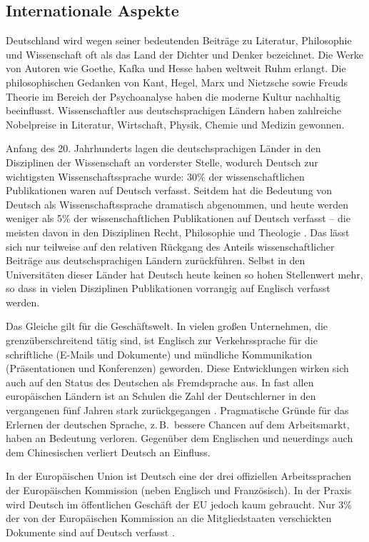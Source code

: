 \begin{multicols}{2}
\subsection{Internationale Aspekte}

Deutschland wird wegen seiner bedeutenden Beiträge zu Literatur, Philosophie und Wissenschaft oft als das Land der Dichter und Denker bezeichnet. 
Die Werke von Autoren wie Goethe, Kafka und Hesse haben weltweit Ruhm erlangt. Die philosophischen Gedanken von Kant, Hegel, Marx und Nietzsche sowie Freuds Theorie im Bereich der Psychoanalyse haben die moderne Kultur nachhaltig beeinflusst. Wissenschaftler aus deutschsprachigen Ländern haben zahlreiche Nobelpreise in Literatur, Wirtschaft, Physik, Chemie und Medizin gewonnen.


Anfang des 20. Jahrhunderts lagen 
die deutschsprachigen Länder in den Disziplinen der Wissenschaft an
vorderster Stelle, wodurch Deutsch zur wichtigsten Wissenschaftssprache wurde: 30\% der wissenschaftlichen Publikationen waren auf Deutsch verfasst. Seitdem hat die Bedeutung von Deutsch als Wissenschaftssprache dramatisch abgenommen, und heute werden weniger als 5\% der wissenschaftlichen Publikationen auf Deutsch verfasst -- die meisten davon in den Disziplinen Recht, Philosophie und Theologie \cite{joy1}. Das lässt sich nur teilweise 
auf den relativen Rückgang des Anteils wissenschaftlicher Beiträge aus deutschsprachigen
Ländern zurückführen. Selbst in den Universitäten dieser Länder hat Deutsch heute keinen so hohen Stellenwert mehr, so dass in vielen Disziplinen Publikationen vorrangig auf Englisch verfasst werden.

Das Gleiche gilt für die Geschäftswelt. In vielen großen Unternehmen, die grenzüberschreitend tätig sind, ist Englisch zur Verkehrssprache für die schriftliche (E-Mails und Dokumente) und mündliche Kommunikation (Präsentationen und Konferenzen) geworden. Diese Entwicklungen wirken sich auch auf den Status des Deutschen als Fremdsprache aus. 
In fast allen europäischen Ländern ist an Schulen die Zahl der Deutschlerner in den vergangenen fünf Jahren stark zurückgegangen \cite{spiegel2012}. Pragmatische Gründe für das Erlernen der deutschen Sprache, z.\,B.~bessere Chancen auf dem Arbeitsmarkt, haben an Bedeutung verloren. Gegenüber dem Englischen und neuerdings auch dem Chinesischen verliert Deutsch an Einfluss. 

In der Europäischen Union ist Deutsch eine der drei offiziellen Arbeitssprachen der Europäischen Kommission (neben Englisch und Französisch). In der Praxis wird Deutsch im öffentlichen Geschäft der EU jedoch kaum gebraucht. Nur 3\% der von der Europäischen Kommission an die Mitgliedstaaten verschickten Dokumente sind auf Deutsch verfasst \cite{joy1}. 


\end{multicols}
